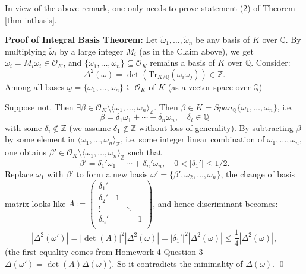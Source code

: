 In view of the above remark, one only needs to prove statement (2) of Theorem \ref{thm-intbasis}.

\medskip
\noindent\textbf{Proof of Integral Basis Theorem:} Let $\tilde{\omega}_1, \ldots, \tilde{\omega}_n$ be any basis of $K$ over $\mathbb{Q}$. By multiplying $\tilde{\omega}_i$ by a large integer $M_i$ (as in the Claim above), we get $\omega_i = M_i \tilde{\omega}_i \in \mathcal{O}_K$, and $\{\omega_1, \ldots, \omega_n\} \subseteq \mathcal{O}_K$ remains a basis of $K$ over $\mathbb{Q}$. Consider:
$$
\Delta^2(\omega) = \det\left(\mathrm{Tr}_{K/\mathbb{Q}}(\omega_i \omega_j)\right) \in \mathbb{Z}.
$$
Among all bases $\underline{\omega} = \{\omega_1, \ldots, \omega_n\} \subseteq \mathcal{O}_K$ of $K$ (as a vector space over $\mathbb{Q}$) - 
\begin{center}
\end{center}
Suppose not. Then $\exists \beta \in \mathcal{O}_K \setminus \langle \omega_1, \ldots, \omega_n \rangle_{\mathbb{Z}}$. Then
$\beta \in K = Span_{\mathbb{Q}}\{\omega_1, \dots, \omega_n\}$, i.e. 
$$
\beta = \delta_1 \omega_1 + \cdots + \delta_n \omega_n, \quad \delta_i \in \mathbb{Q}
$$
with some $\delta_i \notin \mathbb{Z}$ (we assume $\delta_1 \notin \mathbb{Z}$ without loss of generality). By subtracting $\beta$ by some element in $\langle \omega_1, \ldots, \omega_n \rangle_{\mathbb{Z}}$, i.e. some integer linear combination of $\omega_1, \dots, \omega_n$, one obtains $\beta' \in \mathcal{O}_K \setminus \langle \omega_1, \ldots, \omega_n \rangle_{\mathbb{Z}}$ such that
$$
\beta' = \delta_1' \omega_1 + \cdots + \delta_n' \omega_n, \quad 0 < |\delta_1'| \leq 1/2.
$$
Replace $\omega_1$ with $\beta'$ to form a new basis $\underline{\omega}' = \{\beta',\omega_2,\dots,\omega_n\}$, the change of basis matrix looks like $A := \begin{pmatrix}
\delta_1' &    &  &  \\
\delta_2' & 1   &  &  \\
\vdots &  &   \ddots  &  \\
\delta_n' &    &   &  1 \\
\end{pmatrix}$, and hence discriminant becomes:
$$
|\Delta^2(\omega')| = |\det(A)|^2|\Delta^2(\omega)| = |\delta_1'|^2|\Delta^2(\omega)| \leq \frac{1}{4}|\Delta^2(\omega)|,
$$
(the first equality comes from Homework 4 Question 3 - $\Delta(\omega') = \det(A)\Delta(\omega)$). So it contradicts the minimality of $\Delta(\omega)$. \qed

